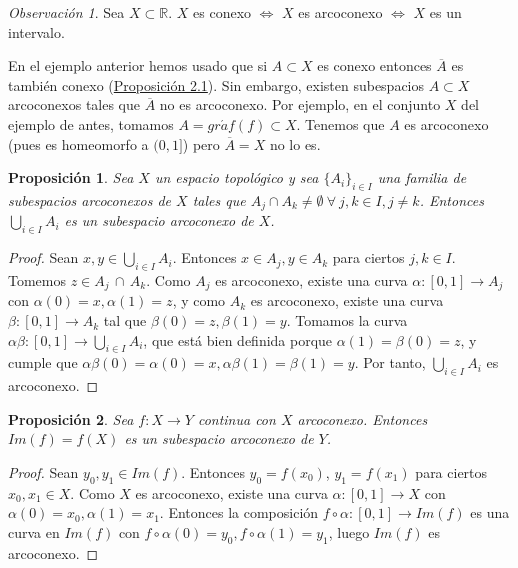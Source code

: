 \documentclass[12pt]{report}
\newtheorem{proposition}{Proposición}[chapter]
\theoremstyle{definition}
\theoremstyle{definition}
\theoremstyle{remark}
\newtheorem*{obs}{Observación} %
\newcommand{\R}{\mathbb R}
\begin{document}
\begin{obs}
Sea $X \subset \R$. $X$ es conexo $\iff$ $X$ es arcoconexo $\iff$ $X$ es un intervalo.
\end{obs}

\vspace{2mm}
En el ejemplo anterior hemos usado que si $A \subset X$ es conexo entonces $\overline{A}$ es también conexo (\hyperref[prop2.1.]{\color{blue}Proposición 2.1}). Sin embargo, existen subespacios $A \subset X$ arcoconexos tales que $\overline{A}$ no es arcoconexo. Por ejemplo, en el conjunto $X$ del ejemplo de antes, tomamos $A = gr\acute{a}f(f) \subset X$. Tenemos que $A$ es arcoconexo (pues es homeomorfo a $(0,1]$) pero $\overline{A} = X$ no lo es.

\begin{proposition}
Sea $X$ un espacio topológico y sea $\{A_i\}_{i \in I}$ una familia de subespacios arcoconexos de $X$ tales que $A_j \cap A_k \neq \emptyset \ \forall \ j,k \in I, j \neq k$. Entonces $\bigcup_{i \in I}A_i$ es un subespacio arcoconexo de $X$. 
\end{proposition}

\begin{proof}
Sean $x,y \in \bigcup_{i \in I}A_i$. Entonces $x \in A_j, y \in A_k$ para ciertos $j,k \in I$. Tomemos $z \in A_j \, \cap \, A_k$. Como $A_j$ es arcoconexo, existe una curva $\alpha \colon [0,1] \to A_j$ con $\alpha(0) = x, \alpha(1) = z$, y como $A_k$ es arcoconexo, existe una curva $\beta \colon [0,1] \to A_k$ tal que $\beta(0) = z, \beta(1) = y$. Tomamos la curva $\alpha\beta \colon [0,1] \to \bigcup_{i \in I}A_i$, que está bien definida porque $\alpha(1) = \beta(0) = z$, y cumple que $\alpha\beta (0) = \alpha(0) = x, \alpha\beta(1) = \beta(1) = y$. Por tanto, $\bigcup_{i \in I}A_i$ es arcoconexo.
\end{proof}

\begin{proposition}
Sea $f \colon X \to Y$ continua con $X$ arcoconexo. Entonces $Im(f) = f(X)$ es un subespacio arcoconexo de $Y$.
\end{proposition}

\begin{proof}
Sean $y_0, y_1 \in Im(f)$. Entonces $y_0 = f(x_0)$, $y_1 = f(x_1)$ para ciertos $x_0,x_1 \in X$. Como $X$ es arcoconexo, existe una curva $\alpha \colon [0,1] \to X$ con $\alpha(0) = x_0, \alpha(1) = x_1$. Entonces la composición $f \circ \alpha \colon [0,1] \to Im(f)$ es una curva en $Im(f)$ con $f \circ \alpha(0) = y_0, f \circ \alpha(1) = y_1$, luego $Im(f)$ es arcoconexo.
\end{proof}
\end{document}

